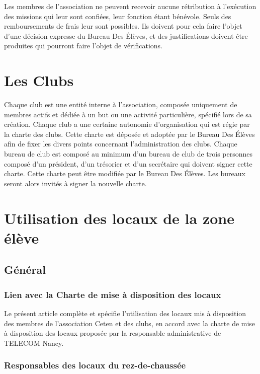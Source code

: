 \documentclass{article} %
\begin{document}
			Les membres de l’association ne peuvent recevoir aucune rétribution
			à l'exécution des missions qui leur sont confiées, leur fonction
			étant bénévole. Seuls des remboursements de frais leur sont
			possibles. Ils doivent pour cela faire l'objet d'une décision
			expresse du Bureau Des Élèves, et des justifications doivent être
			produites qui pourront faire l'objet de vérifications.

	\section{Les Clubs}
\label{sec:clubs}

		Chaque club est une entité interne à l’association, composée uniquement de
		membres actifs et dédiée à un but ou une activité particulière, spécifié lors
		de sa création. Chaque club a une certaine autonomie d'organisation qui est
		régie par la charte des clubs. Cette charte est déposée et adoptée par le
		Bureau Des Élèves afin de fixer les divers points concernant l’administration
		des clubs. Chaque bureau de club est composé au minimum d’un bureau de club
		de trois personnes composé d’un président, d’un trésorier et d’un secrétaire
		qui doivent signer cette charte. Cette charte peut être modifiée par le
		Bureau Des Élèves. Les bureaux seront alors invités à signer la nouvelle
		charte.

	\section{Utilisation des locaux de la zone élève}
\label{sec:locaux_est}

		\subsection{Général}

			\subsubsection{Lien avec la Charte de mise à disposition des locaux}

				Le présent article complète et spécifie l’utilisation des locaux
				mis à disposition des membres de l’association Ceten et des
				clubs, en accord avec la charte de mise à disposition des locaux
				proposée par la responsable administrative de TELECOM
				Nancy.

			\subsubsection{Responsables des locaux du rez-de-chaussée}
\end{document}
